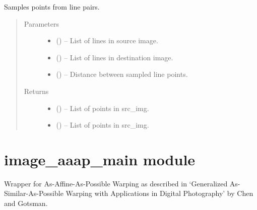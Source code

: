\documentclass[letterpaper,10pt,english]{sphinxmanual}
\begin{document}
\begin{fulllineitems}
\label{\detokenize{image_aaap:image_aaap.sample_lines}}
Samples points from line pairs.
\begin{quote}\begin{description}
\item[{Parameters}] \leavevmode\begin{itemize}
\item {} 
 () -- List of lines in source image.

\item {} 
 () -- List of lines in destination image.

\item {} 
 () -- Distance between sampled line points.

\end{itemize}

\item[{Returns}] \leavevmode
\begin{itemize}
\item {} 
 () -- List of points in src\_img.

\item {} 
 () -- List of points in src\_img.

\end{itemize}


\end{description}\end{quote}

\end{fulllineitems}



\chapter{image\_aaap\_main module}
\label{\detokenize{image_aaap_main:image-aaap-main-module}}\label{\detokenize{image_aaap_main:module-image_aaap_main}}\label{\detokenize{image_aaap_main::doc}}
Wrapper for As-Affine-As-Possible Warping as described in
`Generalized As-Similar-As-Possible Warping with
Applications in Digital Photography' by Chen and Gotsman.
\end{document}
